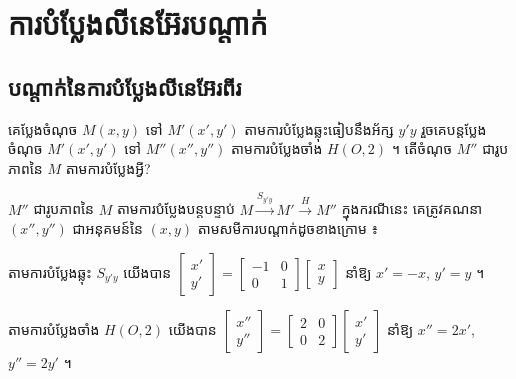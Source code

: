 \section{ការបំប្លែងលីនេអ៊ែរបណ្ដាក់}
\subsection{បណ្ដាក់នៃការបំប្លែងលីនេអ៊ែរពីរ}

\begin{example}[ឧទាហរណ៍]
គេប្លែងចំណុច $M(x, y)$ ទៅ $M'(x', y')$ តាមការបំប្លែងឆ្លុះធៀបនឹងអ័ក្ស $y'y$ រួចគេបន្តប្លែងចំណុច $M'(x', y')$ ទៅ $M''(x'', y'')$ តាមការបំប្លែងចាំង $H(O, 2)$ ។ តើចំណុច $M''$ ជារូបភាពនៃ $M$ តាមការបំប្លែងអ្វី?
\end{example}

\begin{center}
\end{center}

$M''$ ជារូបភាពនៃ $M$ តាមការបំប្លែងបន្តបន្ទាប់ $M \xrightarrow{S_{y'y}} M' \xrightarrow{H} M''$ ក្នុងករណីនេះ គេត្រូវគណនា $(x'', y'')$ ជាអនុគមន៍នៃ $(x, y)$ តាមសមីការបណ្ដាក់ដូចខាងក្រោម ៖

តាមការបំប្លែងឆ្លុះ $S_{y'y}$ យើងបាន $\begin{bmatrix} x'\\ y' \end{bmatrix} = \begin{bmatrix} -1 & 0\\ 0 & 1 \end{bmatrix}\begin{bmatrix} x\\ y \end{bmatrix}$ នាំឱ្យ $x' = -x$, $y' = y$ ។

តាមការបំប្លែងចាំង $H(O, 2)$ យើងបាន $\begin{bmatrix} x''\\ y'' \end{bmatrix} = \begin{bmatrix} 2 & 0\\ 0 & 2 \end{bmatrix}\begin{bmatrix} x'\\ y' \end{bmatrix}$ នាំឱ្យ $x'' = 2x'$, $y'' = 2y'$ ។

